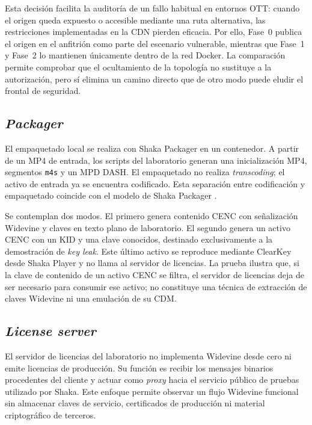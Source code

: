 Esta decisión facilita la auditoría de un fallo habitual en entornos OTT: cuando el origen queda expuesto o accesible mediante una ruta alternativa, las restricciones implementadas en la CDN pierden eficacia. Por ello, Fase~0 publica el origen en el anfitrión como parte del escenario vulnerable, mientras que Fase~1 y Fase~2 lo mantienen únicamente dentro de la red Docker. La comparación permite comprobar que el ocultamiento de la topología no sustituye a la autorización, pero sí elimina un camino directo que de otro modo puede eludir el frontal de seguridad.

\subsection{\textit{Packager}}

El empaquetado local se realiza con Shaka Packager en un contenedor. A partir de un MP4 de entrada, los scripts del laboratorio generan una inicialización MP4, segmentos \nolinkurl{m4s} y un MPD DASH. El empaquetado no realiza \textit{transcoding}; el activo de entrada ya se encuentra codificado. Esta separación entre codificación y empaquetado coincide con el modelo de Shaka Packager \cite{shaka-packager-docs}.

Se contemplan dos modos. El primero genera contenido CENC con señalización Widevine y claves en texto plano de laboratorio. El segundo genera un activo CENC con un KID y una clave conocidos, destinado exclusivamente a la demostración de \textit{key leak}. Este último activo se reproduce mediante ClearKey desde Shaka Player y no llama al servidor de licencias. La prueba ilustra que, si la clave de contenido de un activo CENC se filtra, el servidor de licencias deja de ser necesario para consumir ese activo; no constituye una técnica de extracción de claves Widevine ni una emulación de su CDM.

\subsection{\textit{License server}}

El servidor de licencias del laboratorio no implementa Widevine desde cero ni emite licencias de producción. Su función es recibir los mensajes binarios procedentes del cliente y actuar como \textit{proxy} hacia el servicio público de pruebas utilizado por Shaka. Este enfoque permite observar un flujo Widevine funcional sin almacenar claves de servicio, certificados de producción ni material criptográfico de terceros.

